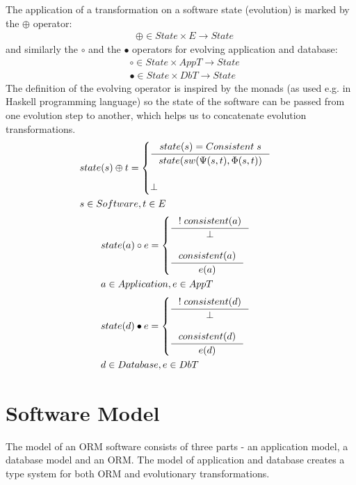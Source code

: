 \documentclass[11pt]{article}
\begin{document}
The application of a transformation on a software state (evolution) is marked by the $\oplus$ operator:
\begin{align*}
& \oplus \in State \times E \rightarrow State
\end{align*}
and similarly the $\circ$ and the $\bullet$ operators for evolving application and database:
\begin{align*}
& \circ \in State \times AppT \rightarrow State \\
& \bullet \in State \times DbT \rightarrow State
\end{align*}
The definition of the evolving operator is inspired by the monads (as used e.g. in Haskell programming language) so the state of the software can be passed from one evolution step to another, which helps us to concatenate evolution transformations.
\begin{align*}
& state(s) \oplus t = \begin{cases}
 	\inference{state(s) = Consistent \; s}{state(sw(\Psi(s, t), \Phi(s,t))} \\ \\
 	\perp
\end{cases}\\ 
& s \in Software, t \in E
\end{align*}
\begin{align*}
& state(a) \circ e = \begin{cases}
 	\inference{!\;consistent(a)}{\perp} \\ \\
 	\inference{consistent(a)}{e(a)} 
\end{cases}\\ 
& a \in Application, e \in AppT
\end{align*}
\begin{align*}
&  state(d) \bullet e = \begin{cases}
 	\inference{!\;consistent(d)}{\perp} \\ \\
 	\inference{consistent(d)}{e(d)} 
\end{cases}\\ 
& d \in Database, e \in DbT
\end{align*}

\section{Software Model}
The model of an ORM software consists of three parts - an application model, a database model and an ORM. The model of application and database creates a type system for both ORM and evolutionary transformations.
\end{document}
